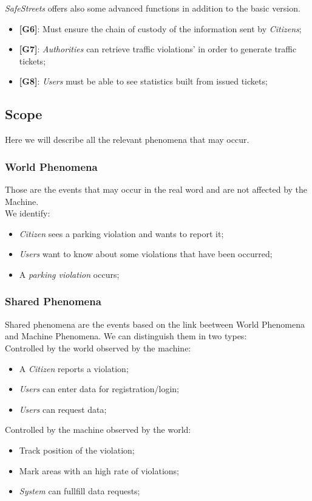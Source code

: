 \documentclass{article}
\begin{document}
\textit{SafeStreets} offers also some advanced functions in addition to the basic version.
\begin{itemize}
    \item \textbf{[G6]}: Must ensure the chain of custody of the information sent by \textit{Citizens};
    \item \textbf{[G7]}: \textit{Authorities} can retrieve traffic violations' in order to generate traffic tickets;
    \item \textbf{[G8]}: \textit{Users} must be able to see statistics built from issued tickets;
\end{itemize}

\subsection{Scope}
Here we will describe all the relevant phenomena that may occur. 

\subsubsection{World Phenomena}
Those are the events that may occur in the real word and are not affected by the Machine.
\\We identify:
\begin{itemize}
    \item \textit{Citizen} sees a parking violation and wants to report it;
    \item \textit{Users} want to know about some violations that have been occurred;
    \item A \textit{parking violation} occurs; 
\end{itemize} 

\subsubsection{Shared Phenomena}
Shared phenomena are the events based on the link beetween World Phenomena and Machine Phenomena.
We can distinguish them in two types:
\\
Controlled by the world observed by the machine:
\begin{itemize}
    \item A \textit{Citizen} reports a violation;
    \item \textit{Users} can enter data for registration/login;
    \item \textit{Users} can request data;
\end{itemize}
Controlled by the machine observed by the world:
\begin{itemize}
    \item Track position of the violation;
    \item Mark areas with an high rate of violations;
    \item \textit{System} can fullfill data requests;
\end{itemize}
\end{document}
